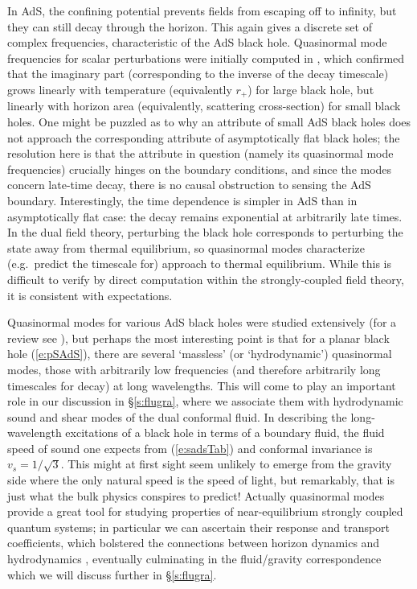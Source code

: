 \documentclass[12pt,a4paper]{article}
\def\sect#1{\S\ref{#1}}
\def\req#1{(\ref{#1})}
\def\rh{r_+}
\begin{document}
In AdS, the confining potential prevents fields from escaping off to infinity, but they can still decay through the horizon.  This again gives a discrete set of complex frequencies, characteristic of the AdS black hole.
Quasinormal mode frequencies for scalar perturbations were initially computed in \cite{Horowitz:1999jd}, which  confirmed that the imaginary part (corresponding to the inverse of the decay timescale)  grows linearly with temperature (equivalently $\rh$) for large black hole, but linearly with horizon area (equivalently, scattering cross-section) for small black holes.  One might be puzzled as to why an attribute of small AdS black holes does not approach the corresponding attribute of asymptotically flat black holes; the resolution here is that the attribute in question (namely its quasinormal mode frequencies) crucially hinges on the boundary conditions, and since the modes concern late-time decay, there is no causal obstruction to sensing the AdS boundary.
Interestingly, the time dependence is simpler in AdS than in asymptotically flat case:
 the decay remains  exponential at arbitrarily late times. 
 In the dual field theory, perturbing the black hole corresponds to perturbing the state away from thermal equilibrium, so quasinormal modes  characterize (e.g.\ predict the timescale for) approach to thermal equilibrium.  While this is difficult to verify by direct computation within the strongly-coupled field theory, it is consistent with expectations.

Quasinormal modes for various AdS black holes were  studied extensively (for a review see \cite{Berti:2009kk}), but perhaps the most interesting point is that for  a planar black hole \req{e:pSAdS}, there are several `massless' (or `hydrodynamic') quasinormal modes, those with arbitrarily low frequencies (and therefore arbitrarily long timescales for decay) at long wavelengths.  This will come to play an important role in our discussion in \sect{s:flugra}, where we associate them with hydrodynamic sound and shear modes of the dual conformal fluid.  
In describing the long-wavelength excitations of a black hole in terms of a boundary fluid, the fluid speed of sound one expects from \req{e:sadsTab} and conformal invariance is $v_{s} = 1/\sqrt{3}$. This might at first sight seem unlikely to emerge from the gravity side where the only natural speed is the speed of light, but remarkably, that is just what the bulk physics conspires to predict!
Actually quasinormal modes provide a great tool for studying properties of  near-equilibrium strongly coupled quantum systems; in particular we can ascertain their response and transport coefficients, which bolstered the  connections between horizon dynamics and hydrodynamics \cite{Son:2007vk}, eventually culminating in the fluid/gravity correspondence \cite{Bhattacharyya:2008jc} which we will discuss further in \sect{s:flugra}.
\end{document}
